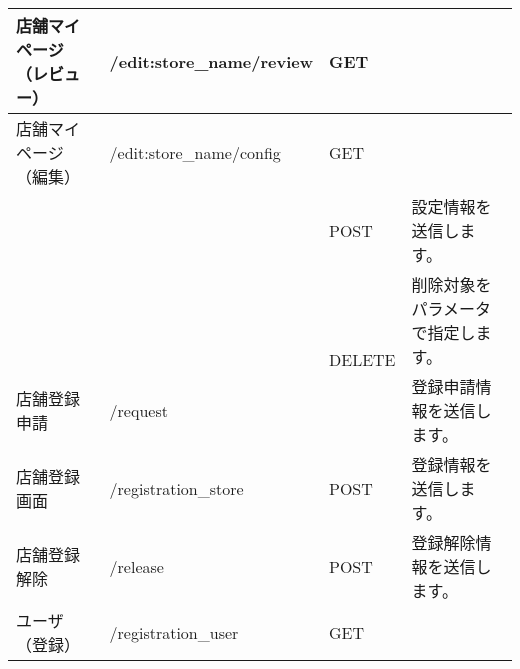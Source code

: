 \documentclass[a4j,titlepage]{jarticle}
\begin{document}
\begin{table}[!htbp]
\begin{center}
\begin{tabular}{|l|l|l|p{4cm}|}
店舗マイページ（レビュー） & /edit:store\_name/review & GET & \\\hline
店舗マイページ（編集） & /edit:store\_name/config & GET & \\\hline
 & & POST & 設定情報を送信します。 \\\hline
 & & \multirow{2}{*}{DELETE} & 削除対象をパラメータで指定します。\\\hline
店舗登録申請 & /request & POST & 登録申請情報を送信します。\\\hline
店舗登録画面 & /registration\_store & POST & 登録情報を送信します。\\\hline
店舗登録解除 & /release & POST & 登録解除情報を送信します。\\\hline
ユーザ（登録） & /registration\_user & GET & \\\hline
\end{tabular}
\end{center}
\end{table}
\end{document}
